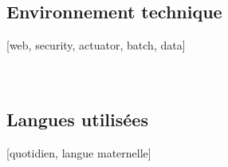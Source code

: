 {    \subsection{Environnement technique}
     [web, security, actuator, batch, data]\\
     \\
      \\
       

    \subsection{Langues utilisées}
    [quotidien, langue maternelle]
}
\makebody
\clearpage



